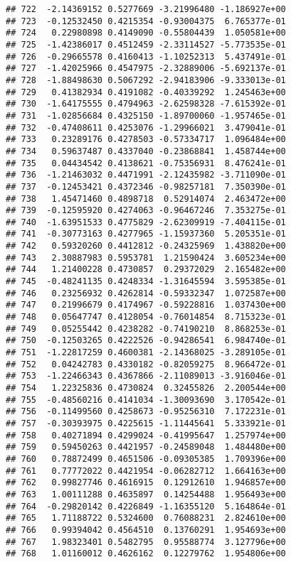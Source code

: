 \documentclass[
]{article}
\begin{document}
\begin{verbatim}
## 722  -2.14369152 0.5277669 -3.21996480 -1.186927e+00
## 723  -0.12532450 0.4215354 -0.93004375  6.765377e-01
## 724   0.22980898 0.4149090 -0.55804439  1.050581e+00
## 725  -1.42386017 0.4512459 -2.33114527 -5.773535e-01
## 726  -0.29665578 0.4160413 -1.10252313  5.437491e-01
## 727  -1.42025966 0.4547975 -2.32889006 -5.692137e-01
## 728  -1.88498630 0.5067292 -2.94183906 -9.333013e-01
## 729   0.41382934 0.4191082 -0.40339292  1.245463e+00
## 730  -1.64175555 0.4794963 -2.62598328 -7.615392e-01
## 731  -1.02856684 0.4325150 -1.89700060 -1.957465e-01
## 732  -0.47408611 0.4253076 -1.29966021  3.479041e-01
## 733   0.23289176 0.4278503 -0.57334717  1.096484e+00
## 734   0.59637487 0.4337040 -0.23868841  1.458744e+00
## 735   0.04434542 0.4138621 -0.75356931  8.476241e-01
## 736  -1.21463032 0.4471991 -2.12435982 -3.711090e-01
## 737  -0.12453421 0.4372346 -0.98257181  7.350390e-01
## 738   1.45471460 0.4898718  0.52914074  2.463472e+00
## 739  -0.12595920 0.4274063 -0.96467246  7.353275e-01
## 740  -1.63951533 0.4775829 -2.62309919 -7.404115e-01
## 741  -0.30773163 0.4277965 -1.15937360  5.205351e-01
## 742   0.59320260 0.4412812 -0.24325969  1.438820e+00
## 743   2.30887983 0.5953781  1.21590424  3.605234e+00
## 744   1.21400228 0.4730857  0.29372029  2.165482e+00
## 745  -0.48241135 0.4248334 -1.31645594  3.595385e-01
## 746   0.23256932 0.4262814 -0.59332347  1.072587e+00
## 747   0.21996679 0.4174967 -0.59228816  1.037430e+00
## 748   0.05647747 0.4128054 -0.76014854  8.715323e-01
## 749   0.05255442 0.4238282 -0.74190210  8.868253e-01
## 750  -0.12503265 0.4222526 -0.94286541  6.984740e-01
## 751  -1.22817259 0.4600381 -2.14368025 -3.289105e-01
## 752   0.04242783 0.4330182 -0.82059275  8.966472e-01
## 753  -1.22466343 0.4367866 -2.11089013 -3.916046e-01
## 754   1.22325836 0.4730824  0.32455826  2.200544e+00
## 755  -0.48560216 0.4141034 -1.30093690  3.170542e-01
## 756  -0.11499560 0.4258673 -0.95256310  7.172231e-01
## 757  -0.30393975 0.4225615 -1.11445641  5.333921e-01
## 758   0.40271894 0.4299024 -0.41995647  1.257974e+00
## 759   0.59450263 0.4421957 -0.24589048  1.484480e+00
## 760   0.78872499 0.4651506 -0.09305385  1.709396e+00
## 761   0.77772022 0.4421954 -0.06282712  1.664163e+00
## 762   0.99827746 0.4616915  0.12912610  1.946857e+00
## 763   1.00111288 0.4635897  0.14254488  1.956493e+00
## 764  -0.29820142 0.4226849 -1.16355120  5.164864e-01
## 765   1.71188722 0.5324600  0.76088231  2.824610e+00
## 766   0.99394042 0.4564510  0.13760291  1.954693e+00
## 767   1.98323401 0.5482795  0.95588774  3.127796e+00
## 768   1.01160012 0.4626162  0.12279762  1.954806e+00

\end{verbatim}
\end{document}
